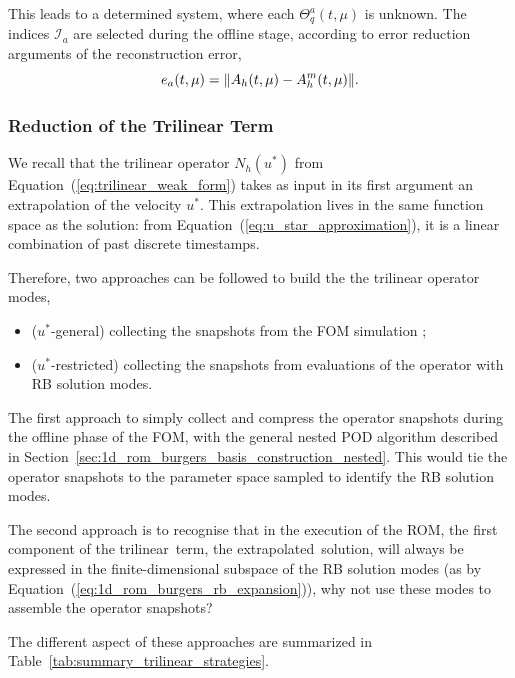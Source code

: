 \documentclass[../../thesis.tex]{subfiles}
\begin{document}
This leads to a determined system, where each $\Theta_q^a(t, \mu)$ is unknown.
The indices $\mathcal{I}_a$ are selected during the offline stage, 
according to error reduction arguments of the reconstruction error,
\begin{equation}
    e_a(t, \mu) = \norm{A_h(t, \mu) - A_h^m(t, \mu)}.
\end{equation}

\newpage
\subsubsection{Reduction of the Trilinear Term}
We recall that the trilinear operator $N_h(u^{*})$ 
from Equation~(\ref{eq:trilinear_weak_form})
takes as input in its first argument an extrapolation of the velocity $u^{*}$.
This extrapolation lives in the same function space as the solution:
from Equation~(\ref{eq:u_star_approximation}),
it is a linear combination of past discrete timestamps.

Therefore, two approaches can be followed to build the the trilinear operator modes,
\begin{itemize}
    \item (\mbox{$u^{*}$-general}) collecting the snapshots from the FOM simulation \cite{Santo_Manzoni_2019};
    \item (\mbox{$u^{*}$-restricted}) collecting the snapshots from evaluations of the operator with RB solution modes.
\end{itemize}
The first approach to simply 
collect and compress the operator snapshots 
during the offline phase of the FOM,
with the general nested POD algorithm described 
in Section~\ref{sec:1d_rom_burgers_basis_construction_nested}.
This would tie the operator snapshots to the parameter space
sampled to identify the RB solution modes.

The second approach is to recognise that in the execution of the ROM,
the first component of the trilinear term, the extrapolated solution, 
will always be expressed in the finite-dimensional subspace of the RB solution modes
(as by Equation~(\ref{eq:1d_rom_burgers_rb_expansion})),
why not use these modes to assemble the operator snapshots?

The different aspect of these approaches are summarized in Table~\ref{tab:summary_trilinear_strategies}.
\end{document}
